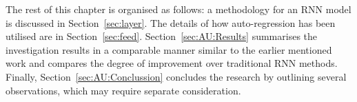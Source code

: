 %
%

%
%
The rest of this chapter is organised as follows: a methodology for an RNN model is discussed in Section~\ref{sec:layer}.
The details of how auto-regression has been utilised are in Section~\ref{sec:feed}.
Section~\ref{sec:AU:Results} summarises the investigation results in a comparable manner similar to the earlier mentioned work and compares the degree of improvement over traditional RNN methods.
Finally, Section~\ref{sec:AU:Conclussion} concludes the research by outlining several observations, which may require separate consideration.

